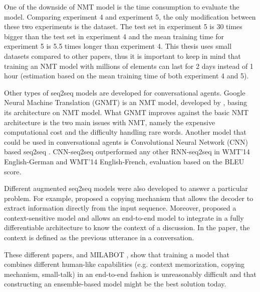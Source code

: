 One of the downside of NMT model is the time consumption to evaluate the model. Comparing experiment 4 and experiment 5, the only modification between these two experiments is the dataset.
The test set in experiment 5 is \num{30} times bigger than the test set in experiment 4 and the mean training time for experiment 5 is \num{5.5} times longer than experiment 4.
This thesis uses small datasets compared to other papers, thus it is important to keep in mind that training an NMT model with millions of elements can last for 2 days instead of 1 hour (estimation based on the mean training time of both experiment 4 and 5).

Other types of seq2seq models are developed for conversational agents. Google Neural Machine Translation (GNMT) is an NMT model, developed by \citet{gnmt-1609.08144}, basing its architecture on \citet{nmt-phd} NMT model.
What GNMT improves against the basic NMT architecture is the two main issues with NMT, namely the expensive computational cost and the difficulty handling rare words.
Another model that could be used in conversational agents is Convolutional Neural Network (CNN) based seq2seq \citep{cnn-seq2seq-1705.03122}. CNN-seq2seq outperformed any other RNN-seq2seq in WMT'14 English-German and WMT'14 English-French, evaluation based on the BLEU score.

Different augmented seq2seq models were also developed to answer a particular problem. For example, \citet{1603.06393} proposed a copying mechanism that allows the decoder to extract information directly from the input sequence.
Moreover, \citet{1506.06714} proposed a context-sensitive model and allows an end-to-end model to integrate in a fully differentiable architecture to know the context of a discussion. In the paper, the context is defined as the previous utterance in a conversation.

These different papers, and MILABOT \citep{alexa-1709.02349}, show that training a model that combines different human-like capabilities (e.g. context memorization, copying mechanism, small-talk) in an end-to-end fashion is unreasonably difficult and that constructing an ensemble-based model might be the best solution today.


